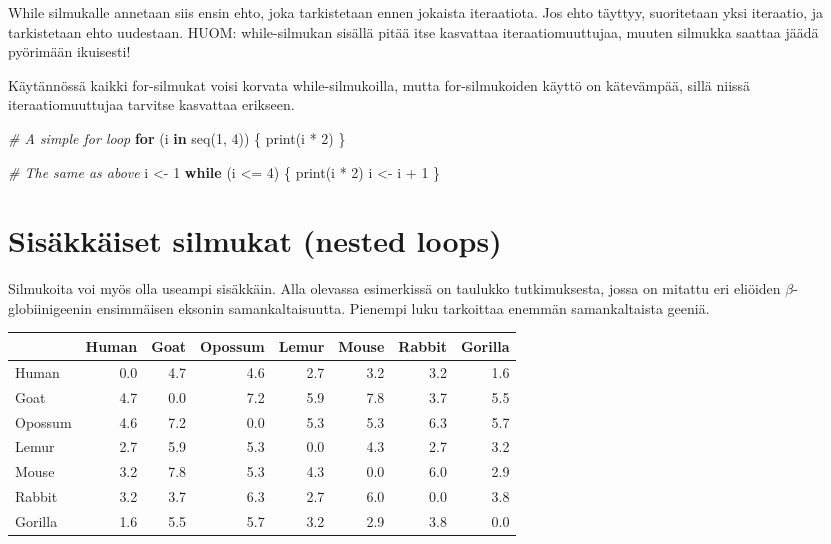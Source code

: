 \documentclass[
]{book}
\newenvironment{Shaded}{\begin{snugshade}}{\end{snugshade}}
\newcommand{\CommentTok}[1]{\textcolor[rgb]{0.56,0.35,0.01}{\textit{#1}}}
\newcommand{\ControlFlowTok}[1]{\textcolor[rgb]{0.13,0.29,0.53}{\textbf{#1}}}
\newcommand{\DecValTok}[1]{\textcolor[rgb]{0.00,0.00,0.81}{#1}}
\newcommand{\FunctionTok}[1]{\textcolor[rgb]{0.00,0.00,0.00}{#1}}
\newcommand{\NormalTok}[1]{#1}
\newcommand{\OtherTok}[1]{\textcolor[rgb]{0.56,0.35,0.01}{#1}}
\newcommand{\SpecialCharTok}[1]{\textcolor[rgb]{0.00,0.00,0.00}{#1}}
\begin{document}
While silmukalle annetaan siis ensin ehto, joka tarkistetaan ennen jokaista iteraatiota. Jos ehto täyttyy, suoritetaan yksi iteraatio, ja tarkistetaan ehto uudestaan. HUOM: while-silmukan sisällä pitää itse kasvattaa iteraatiomuuttujaa, muuten silmukka saattaa jäädä pyörimään ikuisesti!

Käytännössä kaikki for-silmukat voisi korvata while-silmukoilla, mutta for-silmukoiden käyttö on kätevämpää, sillä niissä iteraatiomuuttujaa tarvitse kasvattaa erikseen.

\begin{Shaded}
\begin{Highlighting}[]
\CommentTok{\# A simple for loop}
\ControlFlowTok{for}\NormalTok{ (i }\ControlFlowTok{in} \FunctionTok{seq}\NormalTok{(}\DecValTok{1}\NormalTok{, }\DecValTok{4}\NormalTok{)) \{}
  \FunctionTok{print}\NormalTok{(i }\SpecialCharTok{*} \DecValTok{2}\NormalTok{)}
\NormalTok{\}}

\CommentTok{\# The same as above}
\NormalTok{i }\OtherTok{\textless{}{-}} \DecValTok{1}
\ControlFlowTok{while}\NormalTok{ (i }\SpecialCharTok{\textless{}=} \DecValTok{4}\NormalTok{) \{}
  \FunctionTok{print}\NormalTok{(i }\SpecialCharTok{*} \DecValTok{2}\NormalTok{)}
\NormalTok{  i }\OtherTok{\textless{}{-}}\NormalTok{ i }\SpecialCharTok{+} \DecValTok{1}
\NormalTok{\}}
\end{Highlighting}
\end{Shaded}

\hypertarget{sisuxe4kkuxe4iset-silmukat-nested-loops}{%
\section{Sisäkkäiset silmukat (nested loops)}\label{sisuxe4kkuxe4iset-silmukat-nested-loops}}

Silmukoita voi myös olla useampi sisäkkäin. Alla olevassa esimerkissä on taulukko tutkimuksesta, jossa on mitattu eri eliöiden \(\beta\)- globiinigeenin ensimmäisen eksonin samankaltaisuutta. Pienempi luku tarkoittaa enemmän samankaltaista geeniä.

\begin{tabular}{l|r|r|r|r|r|r|r}
\hline
  & Human & Goat & Opossum & Lemur & Mouse & Rabbit & Gorilla\\
\hline
Human & 0.0 & 4.7 & 4.6 & 2.7 & 3.2 & 3.2 & 1.6\\
\hline
Goat & 4.7 & 0.0 & 7.2 & 5.9 & 7.8 & 3.7 & 5.5\\
\hline
Opossum & 4.6 & 7.2 & 0.0 & 5.3 & 5.3 & 6.3 & 5.7\\
\hline
Lemur & 2.7 & 5.9 & 5.3 & 0.0 & 4.3 & 2.7 & 3.2\\
\hline
Mouse & 3.2 & 7.8 & 5.3 & 4.3 & 0.0 & 6.0 & 2.9\\
\hline
Rabbit & 3.2 & 3.7 & 6.3 & 2.7 & 6.0 & 0.0 & 3.8\\
\hline
Gorilla & 1.6 & 5.5 & 5.7 & 3.2 & 2.9 & 3.8 & 0.0\\
\hline
\end{tabular}
\end{document}
